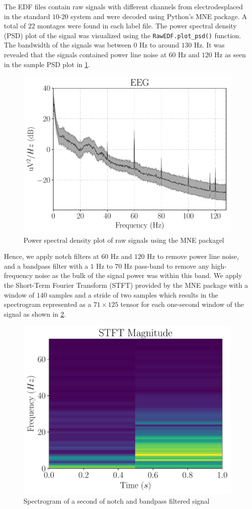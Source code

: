 The EDF files contain raw signals with different channels from electrodesplaced in the standard $10$-$20$ system and were decoded using Python's MNE package. A total of $22$ montages were found in each label file. The power spectral density (PSD) plot of the signal was visualized using the \verb+RawEDF.plot_psd()+ function. The bandwidth of the signals was between $0$ Hz to around $130$ Hz. It was revealed that the signals contained power line noise at $60$ Hz and $120$ Hz as seen in the sample PSD plot in \cref{fig:psd}. 

\begin{figure}[!ht]
	\centering
	\includegraphics[height=0.45\linewidth]{pictures/psd.pdf}
	\caption[Power Spectral Density Plot of Raw Signals]{Power spectral density plot of raw signals using the MNE packagel}\label{fig:psd}  
\end{figure}

Hence, we apply notch filters at $60$ Hz and $120$ Hz to remove power line noise, and a bandpass filter with a $1$ Hz to $70$ Hz pass-band to remove any high-frequency noise as the bulk of the signal power was within this band. We apply the Short-Term Fourier Transform (STFT) provided by the MNE package with a window of $140$ samples and a stride of two samples which results in the spectrogram represented as a $71 \times 125$ tensor for each one-second window of the signal as shown in \cref{fig:stft}. 

\begin{figure}[!ht]
	\centering
	\includegraphics[height=0.45\linewidth]{pictures/plot21.pdf}
	\caption[Example of Spectrogram]{Spectrogram of a second of notch and bandpass filtered signal}\label{fig:stft}  
\end{figure}


